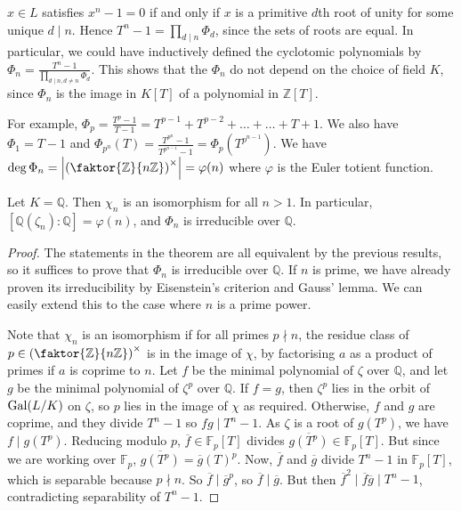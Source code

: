 \( x \in L \) satisfies \( x^n - 1 = 0 \) if and only if \( x \) is a primitive \( d \)th root of unity for some unique \( d \mid n \).
Hence \( T^n - 1 = \prod_{d \mid n} \Phi_d \), since the sets of roots are equal.
In particular, we could have inductively defined the cyclotomic polynomials by \( \Phi_n = \frac{T^n - 1}{\prod_{d \mid n, d \neq n} \Phi_d} \).
This shows that the \( \Phi_n \) do not depend on the choice of field \( K \), since \( \Phi_n \) is the image in \( K[T] \) of a polynomial in \( \mathbb Z[T] \).

For example, \( \Phi_p = \frac{T^p - 1}{T - 1} = T^{p-1} + T^{p-2} + \dots + \dots + T + 1 \).
We also have \( \Phi_1 = T - 1 \) and \( \Phi_{p^n}(T) = \frac{T^{p^n} - 1}{T^{p^{n-1}} - 1} = \Phi_p(T^{p^{n-1}}) \).
We have \( \deg \Phi_n = \abs{\qty(\faktor{\mathbb Z}{n\mathbb Z})^\times} = \varphi(n) \) where \( \varphi \) is the Euler totient function.
\begin{theorem}[rationals]
	Let \( K = \mathbb Q \).
	Then \( \chi_n \) is an isomorphism for all \( n > 1 \).
	In particular, \( [\mathbb Q(\zeta_n) : \mathbb Q] = \varphi(n) \), and \( \Phi_n \) is irreducible over \( \mathbb Q \).
\end{theorem}
\begin{proof}
	The statements in the theorem are all equivalent by the previous results, so it suffices to prove that \( \Phi_n \) is irreducible over \( \mathbb Q \).
	If \( n \) is prime, we have already proven its irreducibility by Eisenstein's criterion and Gauss' lemma.
	We can easily extend this to the case where \( n \) is a prime power.

	Note that \( \chi_n \) is an isomorphism if for all primes \( p \nmid n \), the residue class of \( p \in \qty(\faktor{\mathbb Z}{n\mathbb Z})^\times \) is in the image of \( \chi \), by factorising \( a \) as a product of primes if \( a \) is coprime to \( n \).
	Let \( f \) be the minimal polynomial of \( \zeta \) over \( \mathbb Q \), and let \( g \) be the minimal polynomial of \( \zeta^p \) over \( \mathbb Q \).
	If \( f = g \), then \( \zeta^p \) lies in the orbit of \( \operatorname{Gal}(L/K) \) on \( \zeta \), so \( p \) lies in the image of \( \chi \) as required.
	Otherwise, \( f \) and \( g \) are coprime, and they divide \( T^n - 1 \) so \( fg \mid T^n - 1 \).
	As \( \zeta \) is a root of \( g(T^p) \), we have \( f \mid g(T^p) \).
	Reducing modulo \( p \), \( \overline f \in \mathbb F_p[T] \) divides \( \overline{g(T^p)} \in \mathbb F_p[T] \).
	But since we are working over \( \mathbb F_p \), \( \overline{g(T^p)} = \overline g(T)^p \).
	Now, \( \overline f \) and \( \overline g \) divide \( T^n - 1 \) in \( \mathbb F_p[T] \), which is separable because \( p \nmid n \).
	So \( \overline f \mid \overline g^p \), so \( \overline f \mid \overline g \).
	But then \( \overline f^2 \mid \overline f \overline g \mid T^n - 1 \), contradicting separability of \( T^n - 1 \).
\end{proof}

